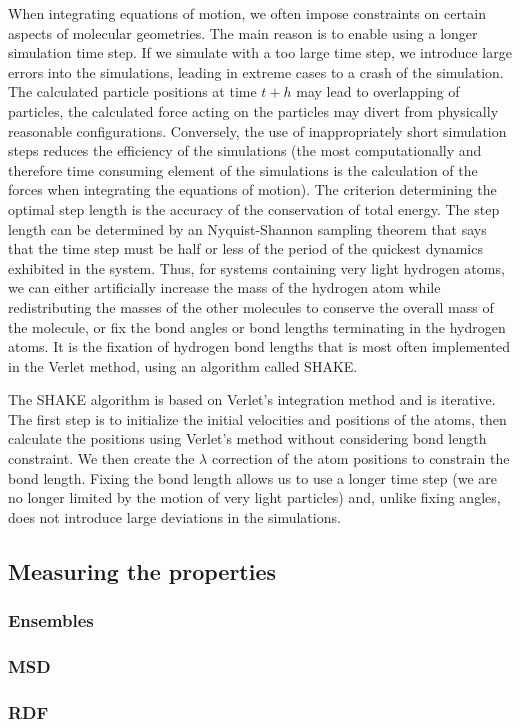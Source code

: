 When integrating equations of motion, we often impose constraints on certain aspects of molecular geometries. The main reason is to enable using a longer simulation time step. If we simulate with a too large time step, we introduce large errors into the simulations, leading in extreme cases to a crash of the simulation. The calculated particle positions at time $t+h$ may lead to overlapping of particles, the calculated force acting on the particles may divert from physically reasonable configurations. Conversely, the use of inappropriately short simulation steps reduces the efficiency of the simulations (the most computationally and therefore time consuming element of the simulations is the calculation of the forces when integrating the equations of motion). \cite{mdskripta} The criterion determining the optimal step length is the accuracy of the conservation of total energy. The step length can be determined by an Nyquist-Shannon \cite{shannon_communication_1949} sampling theorem that says that the time step must be half or less of the period of the quickest dynamics exhibited in the system. Thus, for systems containing very light hydrogen atoms, we can either artificially increase the mass of the hydrogen atom while redistributing the masses of the other molecules to conserve the overall mass of the molecule, or fix the bond angles or bond lengths terminating in the hydrogen atoms. It is the fixation of hydrogen bond lengths that is most often implemented in the Verlet method, using an algorithm called SHAKE. 

The SHAKE algorithm is based on Verlet's integration method and is iterative. The first step is to initialize the initial velocities and positions of the atoms, then calculate the positions using Verlet's method without considering bond length constraint. We then create the $\lambda$ correction of the atom positions to constrain the bond length. Fixing the bond length allows us to use a longer time step (we are no longer limited by the motion of very light particles) and, unlike fixing angles, does not introduce large deviations in the simulations.

\subsection{Measuring the properties}
\subsubsection{Ensembles}
\subsubsection{MSD}
\subsubsection{RDF}